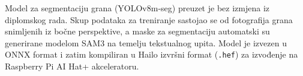 Model za segmentaciju grana (YOLOv8m-seg) preuzet je bez izmjena iz diplomskog rada. Skup podataka za treniranje sastojao se od fotografija grana snimljenih iz bočne perspektive, a maske za segmentaciju automatski su generirane modelom SAM3 na temelju tekstualnog upita. Model je izvezen u ONNX format i zatim kompiliran u Hailo izvršni format (\texttt{.hef}) za izvođenje na Raspberry Pi AI Hat+ akceleratoru.

